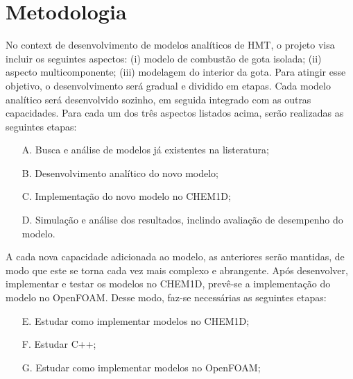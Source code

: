 \section{Metodologia}

No context de desenvolvimento de modelos analíticos de HMT, o projeto visa  incluir os seguintes aspectos:
(i) modelo de combustão de gota isolada;
(ii) aspecto multicomponente; 
(iii) modelagem do interior da gota. 
Para atingir esse objetivo, o desenvolvimento será gradual e dividido em etapas. 
Cada modelo analítico será desenvolvido sozinho, em seguida integrado com as outras capacidades.
Para cada um dos três aspectos listados acima, serão realizadas as seguintes etapas:
\begin{enumerate}
    \item[A.] Busca e análise de modelos já existentes na listeratura;
    \item[B.] Desenvolvimento analítico do novo modelo;
    \item[C.] Implementação do novo modelo no CHEM1D;
    \item[D.] Simulação e análise dos resultados, inclindo avaliação de desempenho do modelo.
\end{enumerate}
A cada nova capacidade adicionada ao modelo, as anteriores serão mantidas, de modo que este se torna cada vez mais complexo e abrangente. 
Após desenvolver, implementar e testar os modelos no CHEM1D, prevê-se a implementação do modelo no OpenFOAM. Desse modo, faz-se necessárias as seguintes etapas:
\begin{itemize}
    \item[E.] Estudar como implementar modelos no CHEM1D; 
    \item[F.] Estudar C++; 
    \item[G.] Estudar como implementar modelos no OpenFOAM; 
\end{itemize}






